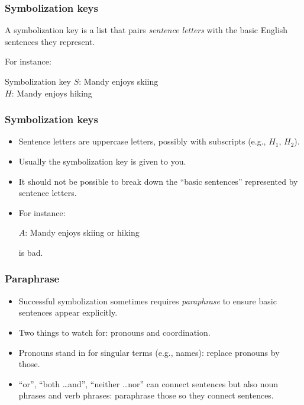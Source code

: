 \begin{frame}
  \frametitle{Symbolization keys}

  \begin{definition}
    A symbolization key is a list that pairs \emph{sentence letters} with
    the basic English sentences they represent.
  \end{definition}

  For instance:

  \begin{block}{Symbolization key}
    $S$: Mandy enjoys skiing\\
    $H$: Mandy enjoys hiking
  \end{block}

\end{frame}

\begin{frame}
  \frametitle{Symbolization keys}

  \begin{itemize}[<+->]
  \item Sentence letters are uppercase letters, possibly with subscripts
  (e.g., $H_1$, $H_2$).
  \item Usually the symbolization key is given to you.
  \item It should not be possible to break down the ``basic
  sentences'' represented by sentence letters.

  \item[] For instance:
  \centerline{$A$: Mandy enjoys skiing or hiking}
  is bad.
  \end{itemize}
\end{frame}

\begin{frame}
  \frametitle{Paraphrase}

  \begin{itemize}[<+->]
  \item Successful symbolization sometimes requires \emph{paraphrase} to
  ensure basic sentences appear explicitly.
  \item Two things to watch for: pronouns and coordination.
  \item Pronouns stand in for singular terms (e.g., names): replace
  pronouns by those.
  \item ``or'', ``both \dots and'', ``neither \dots nor'' can connect sentences but
  also noun phrases and verb phrases: paraphrase those so they connect
  sentences.
  \end{itemize}
\end{frame}

